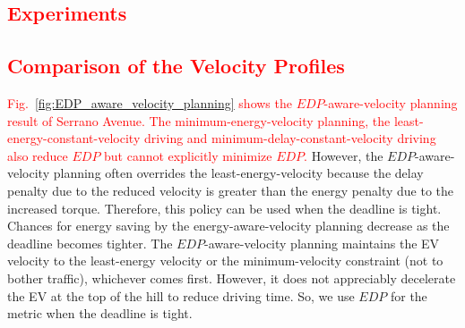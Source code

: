 \documentclass{IEEEtran}
\begin{document}


\textcolor{red}{\section{Experiments}\label{sec:experiment}}


\textcolor{red}{\subsection{Comparison of the Velocity Profiles}}

\textcolor{red}{Fig.~\ref{fig:EDP_aware_velocity_planning} shows the $EDP$-aware-velocity planning result of Serrano Avenue. 
}
%
\textcolor{red}{The minimum-energy-velocity planning, the least-energy-constant-velocity driving and minimum-delay-constant-velocity driving also reduce  $EDP$ but cannot explicitly minimize $EDP$.} However, the $EDP$-aware-velocity planning often overrides the least-energy-velocity because the delay penalty due to the reduced velocity is greater than the energy penalty due to the increased torque. Therefore, this policy can be used when the deadline is tight. Chances for energy saving by the energy-aware-velocity planning decrease as the deadline becomes tighter. 
%
The $EDP$-aware-velocity planning maintains the EV velocity to the least-energy velocity or the minimum-velocity constraint (not to bother traffic), whichever comes first. However, it does not appreciably decelerate the EV at the top of the hill to reduce driving time. So, we use $EDP$ for the metric when the deadline is tight. 
\end{document}
